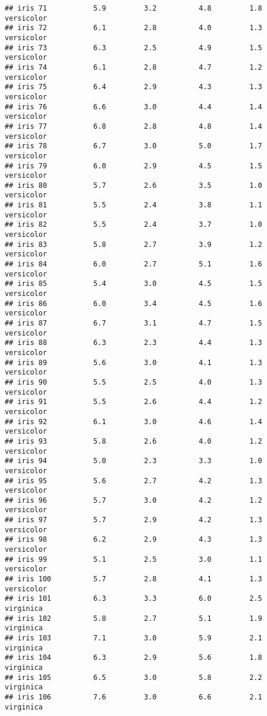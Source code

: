 \documentclass[
]{article}
\begin{document}
\begin{verbatim}
## iris 71           5.9         3.2          4.8         1.8 versicolor
## iris 72           6.1         2.8          4.0         1.3 versicolor
## iris 73           6.3         2.5          4.9         1.5 versicolor
## iris 74           6.1         2.8          4.7         1.2 versicolor
## iris 75           6.4         2.9          4.3         1.3 versicolor
## iris 76           6.6         3.0          4.4         1.4 versicolor
## iris 77           6.8         2.8          4.8         1.4 versicolor
## iris 78           6.7         3.0          5.0         1.7 versicolor
## iris 79           6.0         2.9          4.5         1.5 versicolor
## iris 80           5.7         2.6          3.5         1.0 versicolor
## iris 81           5.5         2.4          3.8         1.1 versicolor
## iris 82           5.5         2.4          3.7         1.0 versicolor
## iris 83           5.8         2.7          3.9         1.2 versicolor
## iris 84           6.0         2.7          5.1         1.6 versicolor
## iris 85           5.4         3.0          4.5         1.5 versicolor
## iris 86           6.0         3.4          4.5         1.6 versicolor
## iris 87           6.7         3.1          4.7         1.5 versicolor
## iris 88           6.3         2.3          4.4         1.3 versicolor
## iris 89           5.6         3.0          4.1         1.3 versicolor
## iris 90           5.5         2.5          4.0         1.3 versicolor
## iris 91           5.5         2.6          4.4         1.2 versicolor
## iris 92           6.1         3.0          4.6         1.4 versicolor
## iris 93           5.8         2.6          4.0         1.2 versicolor
## iris 94           5.0         2.3          3.3         1.0 versicolor
## iris 95           5.6         2.7          4.2         1.3 versicolor
## iris 96           5.7         3.0          4.2         1.2 versicolor
## iris 97           5.7         2.9          4.2         1.3 versicolor
## iris 98           6.2         2.9          4.3         1.3 versicolor
## iris 99           5.1         2.5          3.0         1.1 versicolor
## iris 100          5.7         2.8          4.1         1.3 versicolor
## iris 101          6.3         3.3          6.0         2.5  virginica
## iris 102          5.8         2.7          5.1         1.9  virginica
## iris 103          7.1         3.0          5.9         2.1  virginica
## iris 104          6.3         2.9          5.6         1.8  virginica
## iris 105          6.5         3.0          5.8         2.2  virginica
## iris 106          7.6         3.0          6.6         2.1  virginica

\end{verbatim}
\end{document}
